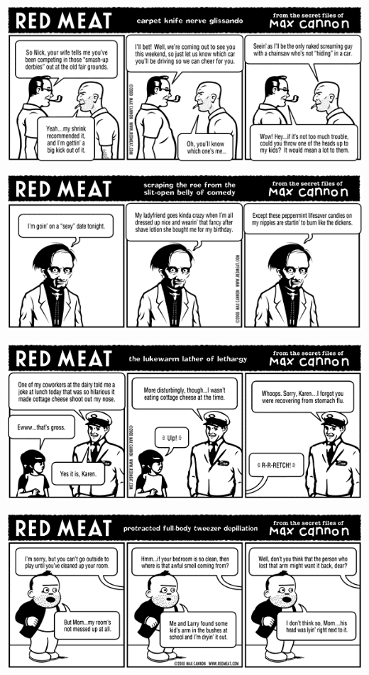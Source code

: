 \documentclass[a4paper,twoside,11pt]{article}
\begin{document}
\includegraphics[width=\textwidth]{redmeat_2000-04-11.png}



\includegraphics[width=\textwidth]{redmeat_2000-04-18.png}



\includegraphics[width=\textwidth]{redmeat_2000-04-25.png}



\includegraphics[width=\textwidth]{redmeat_2000-05-02.png}
\end{document}
